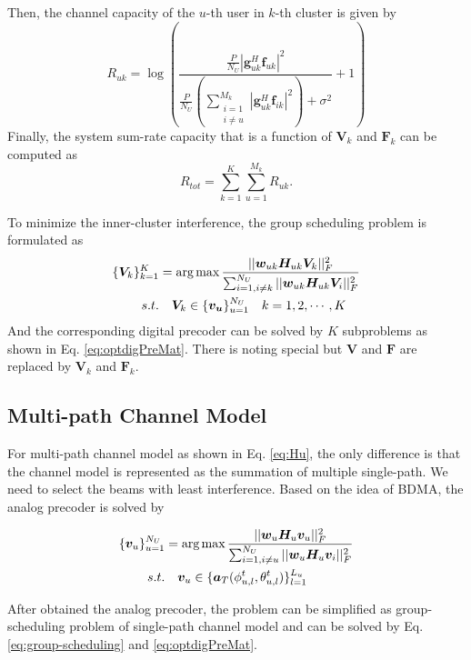 \documentclass[conference]{IEEEtran}
\def\argmax{\mathop{\mbox{arg\,max}}}
\begin{document}
Then, the channel capacity of the $u$-th user in $k$-th cluster is given by 
\begin{equation}\label{eq:6}
R_{uk} = \log\left(\frac{\frac{P}{N_U}|\bm{g}^H_{uk}\bm{f}_{uk}|^2}{\frac{P}{N_U}\left(\displaystyle\sum_{\substack{i=1 \\ i\neq u}}^{M_k}|{\bm{g}}_{uk}^H\bm{f}_{ik}|^2\right)+\sigma^2}+1\right)
\end{equation}
Finally, the system sum-rate capacity that is a function of ${\bm V}_k$ and ${\bm F}_k$ can be computed as
\begin{equation}
R_{tot}=\sum_{k=1}^{K}\sum_{u=1}^{M_k}R_{uk}.
\end{equation}

To minimize the inner-cluster interference, the group scheduling problem is formulated as
\begin{align}\label{eq:group-scheduling}
\{\bm{V}_k\}_{k=1}^{K} &= \argmax \frac{||\bm{w}_{uk} \bm{H}_{uk} \bm{V}_k||_F^2}{\sum_{i=1,i\neq k}^{N_U}||\bm{w}_{uk} \bm{H}_{uk} \bm{V}_i||_F^2}  \\ \nonumber
s.t. &\quad \bm{V}_{k} \in  \{\bm{v_u}\}_{u=1}^{N_U} \quad k = 1,2,\cdots,K
\end{align}
And the corresponding digital precoder can be solved by $K$ subproblems as shown in Eq. \eqref{eq:optdigPreMat}. There is noting special but $\bm{V}$ and $\bm{F}$ are replaced by $\bm{V}_k$ and $\bm{F}_k$.




\subsection{Multi-path Channel Model}
For multi-path channel model as shown in Eq. \eqref{eq:Hu}, the only difference is that the channel model is represented as the summation of multiple single-path. We need to select the beams with least interference. Based on the idea of BDMA, the analog precoder is solved by

\begin{align}\label{eq:analogprecoder}
\{\bm{v}_u\}_{u=1}^{N_U} &= \argmax \frac{||\bm{w}_u \bm{H}_u \bm{v}_u||_F^2}{\sum_{i=1,i\neq u}^{N_U}||\bm{w}_u \bm{H}_u \bm{v}_i||_F^2}  \\ \nonumber
s.t. &\quad \bm{v}_u \in \{ \bm{a}_{T}(\phi^t_{u,l},\theta^t_{u,l})\}_{l=1}^{L_u}
\end{align}

After obtained the analog precoder, the problem can be simplified as group-scheduling problem of single-path channel model and can be solved by Eq. \eqref{eq:group-scheduling} and \eqref{eq:optdigPreMat}.
\end{document}
